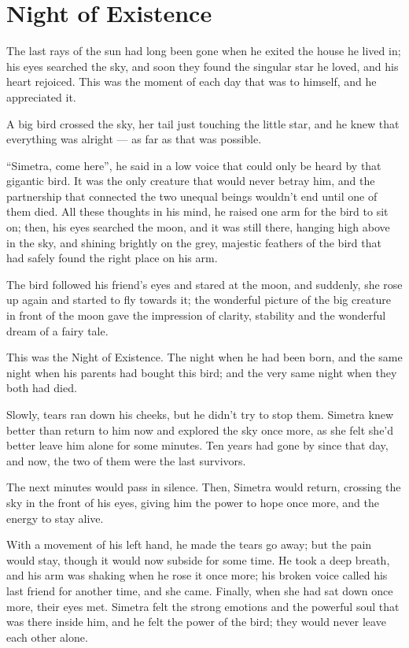 \chapter{Night of Existence}
\label{cha:night-existence}
The last rays of the sun had long been gone when he exited the house he lived in; his eyes searched the sky, and soon they found the singular star he loved, and his heart rejoiced. This was the moment of each day that was to himself, and he appreciated it.

A big bird crossed the sky, her tail just touching the little star, and he knew that everything was alright --- as far as that was possible.

\enquote{Simetra, come here}, he said in a low voice that could only be heard by that gigantic bird. It was the only creature that would never betray him, and the partnership that connected the two unequal beings wouldn't end until one of them died. All these thoughts in his mind, he raised one arm for the bird to sit on; then, his eyes searched the moon, and it was still there, hanging high above in the sky, and shining brightly on the grey, majestic feathers of the bird that had safely found the right place on his arm.

The bird followed his friend's eyes and stared at the moon, and suddenly, she rose up again and started to fly towards it; the wonderful picture of the big creature in front of the moon gave the impression of clarity, stability and the wonderful dream of a fairy tale.

This was the Night of Existence. The night when he had been born, and the same night when his parents had bought this bird; and the very same night when they both had died.

Slowly, tears ran down his cheeks, but he didn't try to stop them. Simetra knew better than return to him now and explored the sky once more, as she felt she'd better leave him alone for some minutes. Ten years had gone by since that day, and now, the two of them were the last survivors.

The next minutes would pass in silence. Then, Simetra would return, crossing the sky in the front of his eyes, giving him the power to hope once more, and the energy to stay alive.

With a movement of his left hand, he made the tears go away; but the pain would stay, though it would now subside for some time. He took a deep breath, and his arm was shaking when he rose it once more; his broken voice called his last friend for another time, and she came. Finally, when she had sat down once more, their eyes met. Simetra felt the strong emotions and the powerful soul that was there inside him, and he felt the power of the bird; they would never leave each other alone.

